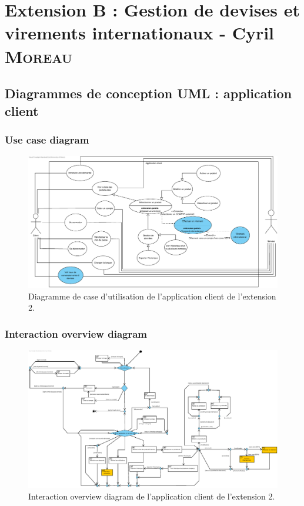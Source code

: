 \documentclass[]{report}
\begin{document}
\chapter{Extension B : Gestion de devises et virements internationaux - Cyril \textsc{Moreau}}



\newpage



\section{Diagrammes de conception UML : application client}



\subsection{Use case diagram}

\begin{figure}[h]
	\centering\includegraphics[width=\linewidth]{img/Use Case Client - Extension 2.pdf}
	\caption{Diagramme de case d'utilisation de l'application client de l'extension 2.}
\end{figure}

\newpage

\subsection{Interaction overview diagram}

\begin{figure}[h]
	\centering\includegraphics[width=\linewidth]{img/Interaction Overview Client - Extension 2.pdf}
	\caption{Interaction overview diagram de l'application client de l'extension 2.}
\end{figure}

\end{document}
